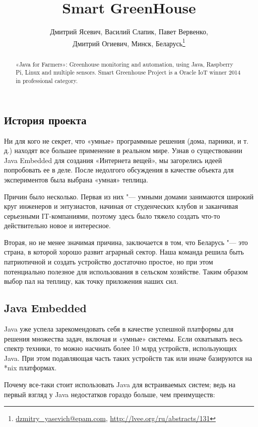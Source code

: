 \documentclass[10pt, a5paper]{article}
\begin{document}
\title{Smart GreenHouse}
\author{Дмитрий Ясевич, Василий Слапик, Павет Вервенко, \\
Дмитрий Огиевич, Минск, Беларусь\footnote{\url{dzmitry_yasevich@epam.com}, \url{http://lvee.org/ru/abstracts/131}}}
\maketitle
\begin{abstract}
«Java for Farmers»: Greenhouse monitoring and automation, using Java, Raspberry Pi, Linux and multiple sensors. Smart Greenhouse Project is a Oracle IoT winner 2014 in professional category.
\end{abstract}
\subsection*{История проекта}

Ни для кого не секрет, что «умные» программные решения (дома, парники, и т.\,д.) находят все большее применение в реальном мире. Узнав о существовании Java Embedded для создания «Интернета вещей», мы загорелись идеей попробовать ее в деле. После недолгого обсуждения в качестве объекта для экспериментов была выбрана «умная» теплица.

Причин было несколько. Первая из них "--- умными домами занимаются широкий круг инженеров и энтузиастов, начиная от студенческих клубов и заканчивая серьезными IT-компаниями, поэтому здесь было тяжело создать что-то действительно новое и интересное.

Вторая, но не менее значимая причина, заключается в том, что Беларусь "--- это страна, в которой хорошо развит аграрный сектор. Наша команда решила быть патриотичной и создать устройство достаточно простое, но при этом потенциально полезное для использования в сельском хозяйстве. Таким образом выбор пал на теплицу, как точку приложения наших сил.

\subsection*{Java Embedded}

Java уже успела зарекомендовать себя в качестве успешной платформы для решения множества задач, включая и «умные» системы. Если охватывать весь спектр техники, то можно насчиать более 10 млрд устройств, использующих Java. При этом подавляющая часть таких устройств так или иначе базируются на *nix платформах.

Почему все-таки стоит использовать Java для встраиваемых систем; ведь на первый взгляд у Java недостатков гораздо больше, чем преимуществ:
\end{document}
